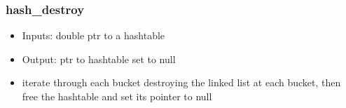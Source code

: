 \documentclass{article}
\begin{document}
\subsubsection{hash_destroy}
\begin{itemize}
    \item Inputs: double ptr to a hashtable 
    \item Output: ptr to hashtable set to null
    \item iterate through each bucket destroying the linked list at each bucket, then free the hashtable and set its pointer to null
\end{itemize}






\end{document}
